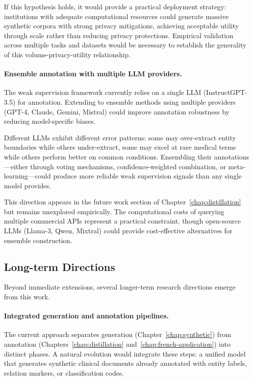 If this hypothesis holds, it would provide a practical deployment strategy: institutions with adequate computational resources could generate massive synthetic corpora with strong privacy mitigations, achieving acceptable utility through scale rather than reducing privacy protections.
Empirical validation across multiple tasks and datasets would be necessary to establish the generality of this volume-privacy-utility relationship.

\paragraph{Ensemble annotation with multiple LLM providers.}

The weak supervision framework currently relies on a single LLM (InstructGPT-3.5) for annotation.
Extending to ensemble methods using multiple providers (GPT-4, Claude, Gemini, Mistral) could improve annotation robustness by reducing model-specific biases.

Different LLMs exhibit different error patterns: some may over-extract entity boundaries while others under-extract, some may excel at rare medical terms while others perform better on common conditions.
Ensembling their annotations—either through voting mechanisms, confidence-weighted combination, or meta-learning—could produce more reliable weak supervision signals than any single model provides.

This direction appears in the future work section of Chapter~\ref{chap:distillation} but remains unexplored empirically.
The computational costs of querying multiple commercial APIs represent a practical constraint, though open-source LLMs (Llama-3, Qwen, Mixtral) could provide cost-effective alternatives for ensemble construction.


\subsection{Long-term Directions}

Beyond immediate extensions, several longer-term research directions emerge from this work.

\paragraph{Integrated generation and annotation pipelines.}

The current approach separates generation (Chapter~\ref{chap:synthetic}) from annotation (Chapters~\ref{chap:distillation} and~\ref{chap:french-application}) into distinct phases.
A natural evolution would integrate these steps: a unified model that generates synthetic clinical documents already annotated with entity labels, relation markers, or classification codes.

